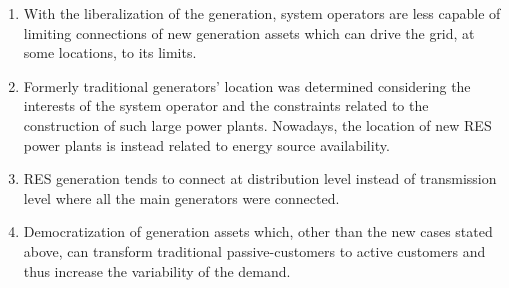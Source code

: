 \begin{enumerate}
\item With the liberalization of the generation, system operators are less capable of limiting
connections of new generation assets which can drive the grid, at some locations, to its
limits.
\item Formerly traditional generators' location was determined considering the interests of the system
operator and the constraints related to the construction of such large power plants.
Nowadays, the location of new RES power plants is instead related to energy source availability.
\item RES generation tends to connect at distribution level instead of transmission level where
all the main generators were connected.
\item Democratization of generation assets which, other than the new cases stated above, can
transform traditional passive-customers to active customers and thus increase the variability
of the demand.

\end{enumerate}

